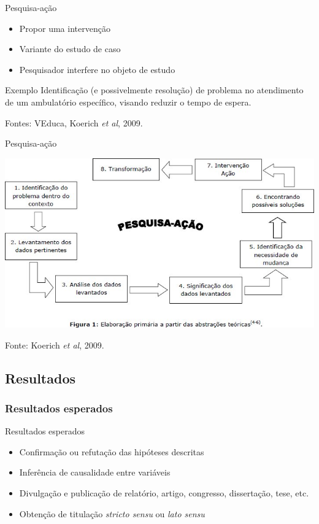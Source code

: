 \documentclass{beamer}
\begin{document}
\begin{frame}{Pesquisa-ação}
  \begin{itemize}
    \footnotesize
  \item Propor uma \alert{intervenção}
  \item Variante do estudo de caso
  \item Pesquisador interfere no objeto de estudo
  \end{itemize}
  \begin{exampleblock}{Exemplo}
    \scriptsize
    Identificação (e possivelmente resolução) de problema no
    atendimento de um ambulatório específico, visando reduzir o tempo
    de espera.
  \end{exampleblock}

  \vfill
  \scriptsize
  Fontes: VEduca, Koerich {\em et al}, 2009.
\end{frame}

\begin{frame}{Pesquisa-ação}
  \begin{center}
    \includegraphics[width=\textwidth]{EstruturaI/pesquisa-acao}
  \end{center}

  \vfill
  \scriptsize
  Fonte: Koerich {\em et al}, 2009.
\end{frame}

\subsection{Resultados}

\subsubsection{Resultados esperados}

\begin{frame}{Resultados esperados}
  \begin{itemize}
    \footnotesize
  \item Confirmação ou refutação das hipóteses descritas
  \bigskip
  \item Inferência de causalidade entre variáveis
  \bigskip
  \item Divulgação e publicação de relatório, artigo, congresso,
    dissertação, tese, etc.
  \bigskip
  \item Obtenção de titulação {\em stricto sensu} ou {\em lato sensu}
  \end{itemize}
\end{frame}
\end{document}
